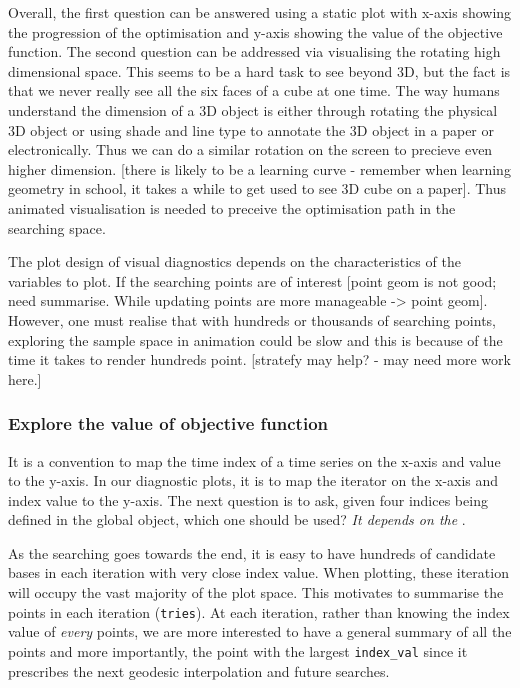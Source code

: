 \documentclass[12pt]{article}
\begin{document}
Overall, the first question can be answered using a static plot with
x-axis showing the progression of the optimisation and y-axis showing
the value of the objective function. The second question can be
addressed via visualising the rotating high dimensional space. This
seems to be a hard task to see beyond 3D, but the fact is that we never
really see all the six faces of a cube at one time. The way humans
understand the dimension of a 3D object is either through rotating the
physical 3D object or using shade and line type to annotate the 3D
object in a paper or electronically. Thus we can do a similar rotation
on the screen to precieve even higher dimension. {[}there is likely to
be a learning curve - remember when learning geometry in school, it
takes a while to get used to see 3D cube on a paper{]}. Thus animated
visualisation is needed to preceive the optimisation path in the
searching space.

The plot design of visual diagnostics depends on the characteristics of
the variables to plot. If the searching points are of interest {[}point
geom is not good; need summarise. While updating points are more
manageable -\textgreater{} point geom{]}. However, one must realise that
with hundreds or thousands of searching points, exploring the sample
space in animation could be slow and this is because of the time it
takes to render hundreds point. {[}stratefy may help? - may need more
work here.{]}

\hypertarget{static}{%
\subsubsection{Explore the value of objective function}\label{static}}

It is a convention to map the time index of a time series on the x-axis
and value to the y-axis. In our diagnostic plots, it is to map the
iterator on the x-axis and index value to the y-axis. The next question
is to ask, given four indices being defined in the global object, which
one should be used? \emph{It depends on the }.

As the searching goes towards the end, it is easy to have hundreds of
candidate bases in each iteration with very close index value. When
plotting, these iteration will occupy the vast majority of the plot
space. This motivates to summarise the points in each iteration
(\texttt{tries}). At each iteration, rather than knowing the index value
of \emph{every} points, we are more interested to have a general summary
of all the points and more importantly, the point with the largest
\texttt{index\_val} since it prescribes the next geodesic interpolation
and future searches.
\end{document}
